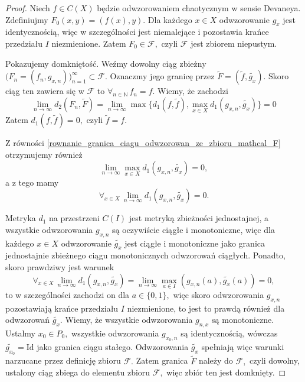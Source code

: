 \documentclass[licencjacka]{pwr_wmat_praca_dyplomowa}
\theoremstyle{plain}
\numberwithin{theorem}{chapter}
\theoremstyle{definition}
\numberwithin{theorem}{chapter}
\begin{document}
\begin{proof}
Niech $f \in C(X)$ będzie odwzorowaniem chaotycznym w sensie Devaneya. Zdefiniujmy $F_0(x,y) = (f(x), y).$ Dla każdego $x \in X$ odwzorowanie $g_x$ jest identycznością, więc w szczególności jest niemalejące i pozostawia krańce przedziału $I$ niezmienione. Zatem $F_0 \in \mathcal{F},$ czyli $\mathcal{F}$ jest zbiorem niepustym.

Pokazujemy domkniętość. Weźmy dowolny ciąg zbieżny $\big(F_n=(f_n, g_{x,n})\big)_{n=1}^{\infty} \subset \mathcal{F}.$ Oznaczmy jego granicę przez $\widetilde{F}=(\widetilde{f}, \widetilde{g_x}).$
Skoro ciąg ten zawiera się w $\mathcal{F}$ to $\forall_{n \in \mathbb{N}} \, f_n = f.$ Wiemy, że zachodzi 
\begin{equation}
\label{rownanie_granica_ciagu_odwzorowan_ze_zbioru_mathcal_F}
\lim_{n \rightarrow \infty} d_2(F_n, \widetilde{F}) = \lim_{n \rightarrow \infty} \max\{d_1(f, \widetilde{f}), \max_{x \in X} d_1(g_{x,n}, \widetilde{g_x})\} = 0
\end{equation}
Zatem $d_1(f, \widetilde{f}) = 0,$ czyli $\widetilde{f} = f.$

Z równości \ref{rownanie_granica_ciagu_odwzorowan_ze_zbioru_mathcal_F} otrzymujemy również 
$$\lim_{n \rightarrow \infty} \max_{x \in X} d_1(g_{x,n}, \widetilde{g_x}) = 0,$$
a z tego mamy 
$$\forall_{x \in X} \, \lim_{n \rightarrow \infty} d_1(g_{x,n}, \widetilde{g_x}) = 0.$$

Metryka $d_1$ na przestrzeni $C(I)$ jest metryką zbieżności jednostajnej, a wszystkie odwzorowania $g_{x,n}$ są oczywiście ciągłe i monotoniczne, więc dla każdego $x \in X$ odwzorowanie $\widetilde{g_x}$ jest ciągłe i monotoniczne jako granica jednostajnie zbieżnego ciągu monotonicznych odwzorowań ciągłych.
Ponadto, skoro prawdziwy jest warunek 
$$\forall_{x \in X} \, \lim_{n \rightarrow \infty} d_1(g_{x,n}, \widetilde{g_x}) = \lim_{n \rightarrow \infty} \max_{a \in I}\left(g_{x,n}(a), \widetilde{g_x}(a)\right) = 0,$$
to w szczególności zachodzi on dla $a \in \{0, 1\},$ więc skoro odwzorowania $g_{x,n}$ pozostawiają krańce przedziału $I$ niezmienione, to jest to prawdą również dla odwzorowań $\widetilde{g_x}.$ Wiemy, że wszystkie odwzorowania $g_{n,x}$ są monotoniczne. Ustalmy $x_0 \in P_0,$ wszystkie odwzorowania $g_{x_0,n}$ są identycznością, wówczas $\widetilde{g_{x_0}} = \textrm{Id}$ jako granica ciągu stałego. Odwzorowania $\widetilde{g_x}$ spełniają więc warunki narzucane przez definicję zbioru $\mathcal{F}.$
Zatem granica $\widetilde{F}$ należy do $\mathcal{F},$ czyli dowolny, ustalony ciąg zbiega do elementu zbioru $\mathcal{F},$ więc zbiór ten jest domknięty.
\end{proof}
\end{document}
